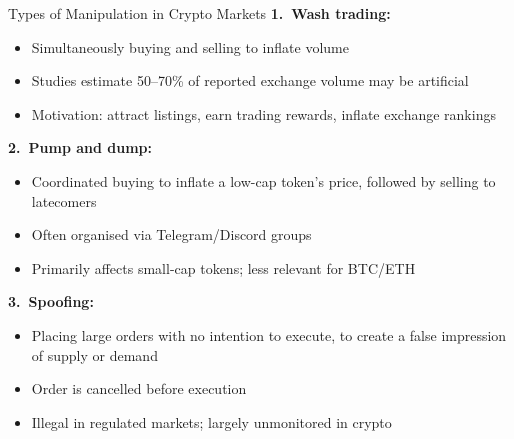 \documentclass[10pt]{beamer}
\begin{document}
\begin{frame}{Types of Manipulation in Crypto Markets}
  \textbf{1.\ Wash trading:}
  \begin{itemize}
    \item Simultaneously buying and selling to inflate volume
    \item Studies estimate 50--70\% of reported exchange volume may be artificial
    \item Motivation: attract listings, earn trading rewards, inflate exchange rankings
  \end{itemize}
  
  \vspace{0.3em}
  \textbf{2.\ Pump and dump:}
  \begin{itemize}
    \item Coordinated buying to inflate a low-cap token's price, followed by selling to latecomers
    \item Often organised via Telegram/Discord groups
    \item Primarily affects small-cap tokens; less relevant for BTC/ETH
  \end{itemize}
  
  \vspace{0.3em}
  \textbf{3.\ Spoofing:}
  \begin{itemize}
    \item Placing large orders with no intention to execute, to create a false impression of supply or demand
    \item Order is cancelled before execution
    \item Illegal in regulated markets; largely unmonitored in crypto
  \end{itemize}
  
\end{frame}
\end{document}
